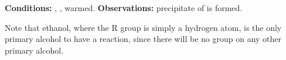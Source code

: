 			\vspace{1.5em}
			\vbox{\textbf{Conditions:}	\tabto{35mm}, , warmed.}
			\vbox{\textbf{Observations:}\tabto{35mm} precipitate of  is formed.}


			Note that ethanol, where the R group is simply a hydrogen atom, is the only primary alcohol to have a reaction, since there will
			be no  group on any other primary alcohol.






















